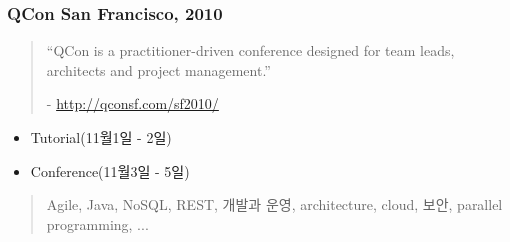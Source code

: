 \begin{frame}
\frametitle{QCon San Francisco, 2010}

\begin{quote}
``QCon is a practitioner-driven conference designed for team leads, architects and project management.''

- \url{http://qconsf.com/sf2010/}
\end{quote}

\begin{itemize}
  \item Tutorial(11월1일 - 2일)
  \item Conference(11월3일 - 5일)
\end{itemize}

\begin{quote}
Agile, Java, NoSQL, REST, 개발과 운영, architecture, cloud, 보안, parallel programming, ...
\end{quote}

\end{frame}

